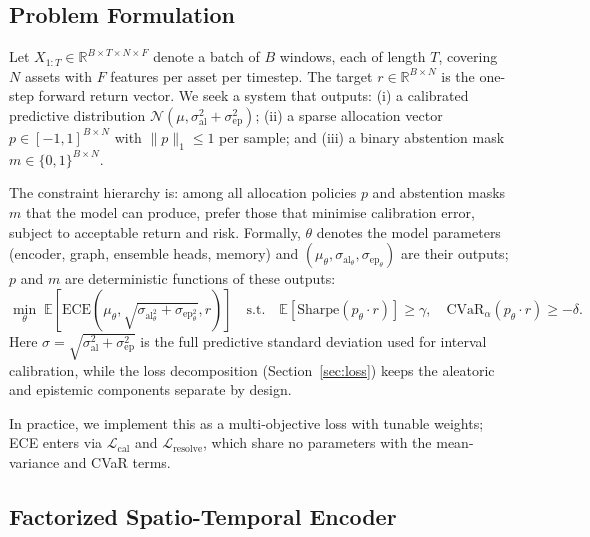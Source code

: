 \documentclass[11pt,a4paper]{article}
\newcommand{\sep}{\sigma_{\mathrm{ep}}}
\newcommand{\sal}{\sigma_{\mathrm{al}}}
\newcommand{\Lres}{\mathcal{L}_{\mathrm{resolve}}}
\newcommand{\ECE}{\mathrm{ECE}}
\begin{document}
\subsection{Problem Formulation}

Let $X_{1:T} \in \mathbb{R}^{B \times T \times N \times F}$ denote a batch
of $B$ windows, each of length $T$, covering $N$ assets with $F$ features per
asset per timestep.  The target $r \in \mathbb{R}^{B \times N}$ is the one-step
forward return vector.  We seek a system that outputs:
(i) a calibrated predictive distribution $\mathcal{N}(\mu, \sal^2 + \sep^2)$;
(ii) a sparse allocation vector $p \in [-1, 1]^{B \times N}$ with
$\|p\|_1 \le 1$ per sample; and
(iii) a binary abstention mask $m \in \{0,1\}^{B \times N}$.

The constraint hierarchy is: among all allocation policies $p$ and abstention
masks $m$ that the model can produce, prefer those that minimise calibration
error, subject to acceptable return and risk.  Formally, $\theta$ denotes the
model parameters (encoder, graph, ensemble heads, memory) and
$(\mu_\theta, \sal_\theta, \sep_\theta)$ are their outputs; $p$ and $m$ are
deterministic functions of these outputs:
\begin{equation}
  \min_{\theta}\; \mathbb{E}[\ECE(\mu_\theta, \sqrt{\sal_\theta^2+\sep_\theta^2}, r)]
  \quad \text{s.t.}\quad
  \mathbb{E}[\text{Sharpe}(p_\theta \cdot r)] \ge \gamma,
  \quad \text{CVaR}_\alpha(p_\theta \cdot r) \ge -\delta.
\end{equation}
Here $\sigma = \sqrt{\sal^2 + \sep^2}$ is the full predictive standard
deviation used for interval calibration, while the loss decomposition
(Section~\ref{sec:loss}) keeps the aleatoric and epistemic components
separate by design.

In practice, we implement this as a multi-objective loss with tunable weights;
ECE enters via $\mathcal{L}_{\mathrm{cal}}$ and $\Lres$, which share no
parameters with the mean-variance and CVaR terms.

\subsection{Factorized Spatio-Temporal Encoder}
\label{sec:encoder}
\end{document}
